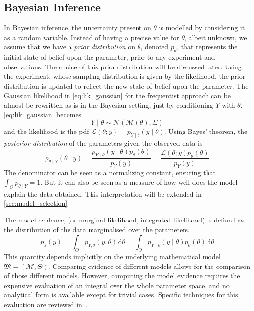 \documentclass[../../Main_ManuscritThese.tex]{subfiles}
\begin{document}
\subsection{Bayesian Inference}
\label{sec:bayesian_inference_MAP}
In Bayesian inference, the uncertainty present on $\theta$ is modelled by considering it as a random variable. Instead of having a precise value for $\theta$, albeit unknown, we assume that we have a \emph{prior distribution} on $\theta$, denoted $p_{\theta}$, that represents the initial state of belief upon the parameter, prior to any experiment and observations. The choice of this prior distribution will be discussed later.
Using the experiment, whose sampling distribution is given by the likelihood, the prior distribution is updated to reflect the new state of belief upon the parameter. 
The Gaussian likelihood in \cref{eq:lik_gaussian} for the frequentist approach can be almost be rewritten as is in the Bayesian setting, just by conditioning $Y$ with $\theta$.
\cref{eq:lik_gaussian} becomes
\begin{equation}
  Y \mid  \theta \sim \mathcal{N}(\mathcal{M}(\theta), \Sigma)
\end{equation}
and the likelihood is the pdf $\mathcal{L}(\theta;y) = p_{Y\mid \theta}(y \mid  \theta)$.
Using Bayes' theorem, the \emph{posterior distribution} of the parameters given the observed data is
\begin{equation}
  \label{eq:bayes_posterior}
  p_{\theta \mid Y}(\theta \mid y) = \frac{p_{Y\mid \theta}(y \mid  \theta)p_{\theta}(\theta)}{p_Y(y)} = \frac{\mathcal{L}(\theta;y)p_{\theta}(\theta)}{p_Y(y)}
\end{equation}
The denominator can be seen as a normalizing constant, ensuring that $\int_{\Theta} p_{\theta \mid Y} = 1$. But it can also be seen as a measure of how well does the model explain the data obtained. This interpretation will be extended in \cref{sec:model_selection}
\begin{definition}
\label{def:model_evidence}
  The model evidence, (or marginal likelihood, integrated likelihood) is defined as the distribution of the data marginalised over the parameters.
  \begin{equation}
    \label{eq:model_evidence}
    p_Y(y) = \int_{\Theta}p_{Y,\theta}(y,\theta)\,\mathrm{d}\theta = \int_{\Theta}p_{Y \mid \theta}(y \mid \theta)p_{\theta}(\theta)\,\mathrm{d}\theta
  \end{equation}
  This quantity depends implicitly on the underlying mathematical model $\mathfrak{M} = (\mathcal{M},\Theta)$. Comparing evidence of different models allows for the comparison of those different models. However, computing the model evidence requires the expensive evaluation of an integral over the whole parameter space, and no analytical form is available except for trivial cases. Specific techniques for this evaluation are reviewed in~\cite{friel_estimating_2011}.
\end{definition}
\end{document}
